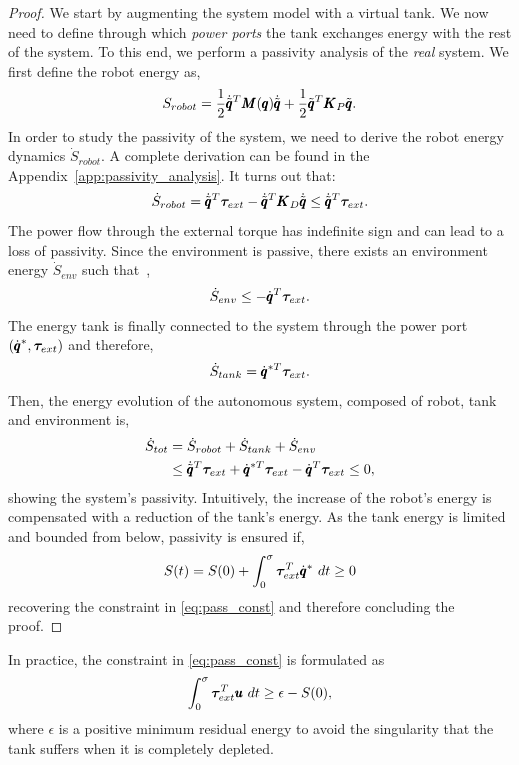 \begin{proof}
We start by augmenting the system model with a virtual tank. We now need to define through which \emph{power ports} the tank exchanges energy with the rest of the system. To this end, we perform a passivity analysis of the \emph{real} system. We first define the robot energy as, 
\begin{equation}
    S_{robot} = \frac{1}{2} \dot{\tilde{\pmb{q}}}^T \pmb{M}(\pmb{q}) \dot{\tilde{\pmb{q}}} + \frac{1}{2} \tilde{\pmb{q}}^T \pmb{K}_P \tilde{\pmb{q}}.
\end{equation}
In order to study the passivity of the system, we need to derive the robot energy dynamics $\dot{S}_{robot}$. A complete derivation can be found in the Appendix~\ref{app:passivity_analysis}. It turns out that:
\begin{equation}
    \dot{S}_{robot} = \dot{\tilde{\pmb{q}}}^T \boldsymbol{\tau}_{ext} - \dot{\tilde{\pmb{q}}}^T \pmb{K}_D \dot{\tilde{\pmb{q}}} \leq \dot{\tilde{\pmb{q}}}^T \boldsymbol{\tau}_{ext}. 
\end{equation}
The power flow through the external torque has indefinite sign and can lead to a loss of passivity. Since the environment is passive, there exists an environment energy $\dot{S}_{env}$ such that~\cite{shahriari2018valve},
\begin{equation}
    \dot{S}_{env} \leq -\dot{\pmb{q}}^T \boldsymbol{\tau}_{ext}.
\end{equation}
The energy tank is finally connected to the system through the power port $(\dot{\pmb{q}}^*, \boldsymbol{\tau}_{ext})$ and therefore,
\begin{equation} \label{eq:tank_dynamics}
\dot{S}_{tank} = \dot{\pmb{q}}^{*T} \boldsymbol{\tau}_{ext}. 
\end{equation}
Then, the energy evolution of the autonomous system, composed of robot, tank and environment is,
\begin{equation}
\begin{aligned}
    \dot{S}_{tot} &= \dot{S}_{robot} + \dot{S}_{tank} + \dot{S}_{env} \\
    &\leq \dot{\tilde{\pmb{q}}}^T \boldsymbol{\tau}_{ext} + \dot{\pmb{q}}^{*T} \boldsymbol{\tau}_{ext} - \dot{\pmb{q}}^T \boldsymbol{\tau}_{ext} \leq 0,
\end{aligned}
\end{equation}
showing the system's passivity.
Intuitively, the increase of the robot's energy is compensated with a reduction of the tank's energy. As the tank energy is limited and bounded from below, passivity is ensured if,
\begin{equation}
    S(t) = S(0) + \int_{0}^{\sigma} \boldsymbol{\tau}_{ext}^T \dconfigRobotDesired \ dt  \geq 0
\end{equation}
recovering the constraint in \eqref{eq:pass_const} and therefore concluding the proof.
\end{proof}
In practice, the constraint in \eqref{eq:pass_const} is formulated as
\begin{equation}
    \int_{0}^{\sigma} \boldsymbol{\tau}_{ext}^T \pmb{u} \ dt \geq \epsilon - S(0),
\end{equation}
where $\epsilon$ is a positive minimum residual energy to avoid the singularity that the tank suffers when it is completely depleted.  

